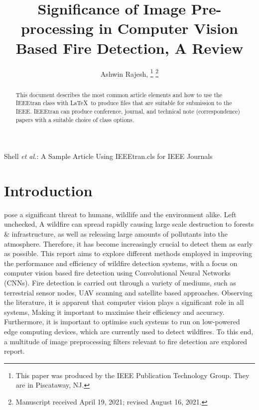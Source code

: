 \documentclass[lettersize,journal]{IEEEtran}
\begin{document}
\title{Significance of Image Pre-processing in Computer Vision Based Fire Detection, A Review}

\author{Ashwin Rajesh,
\thanks{This paper was produced by the IEEE Publication Technology Group. They are in Piscataway, NJ.}%
\thanks{Manuscript received April 19, 2021; revised August 16, 2021.}}

%
{Shell \MakeLowercase{\textit{et al.}}: A Sample Article Using IEEEtran.cls for IEEE Journals}


\maketitle

\begin{abstract}
This document describes the most common article elements and how to use the IEEEtran class with \LaTeX \ to produce files that are suitable for submission to the IEEE.  IEEEtran can produce conference, journal, and technical note (correspondence) papers with a suitable choice of class options. 
\end{abstract}


\section{Introduction}
 pose a significant threat to humans, wildlife and the
environment alike. Left unchecked, A wildfire can spread rapidly causing
large scale destruction to forests \& infrastructure, as well as
releasing large amounts of pollutants into the atmosphere. Therefore, it
has become increasingly crucial to detect them as early as possible.
This report aims to explore different methods employed in improving the
performance and efficiency of wildfire detection systems, with a focus
on computer vision based fire detection using Convolutional Neural
Networks (CNNs). Fire detection is carried out through a variety of
mediums, such as terrestrial sensor nodes, UAV scanning and satellite
based approaches. Observing the literature, it is apparent that computer
vision plays a significant role in all systems, Making it important to
maximise their efficiency and accuracy. Furthermore, it is important to
optimise such systems to run on low-powered edge computing devices,
which are currently used to detect wildfires. To this end, a multitude
of image preprocessing filters relevant to fire detection are explored
report.
\end{document}
